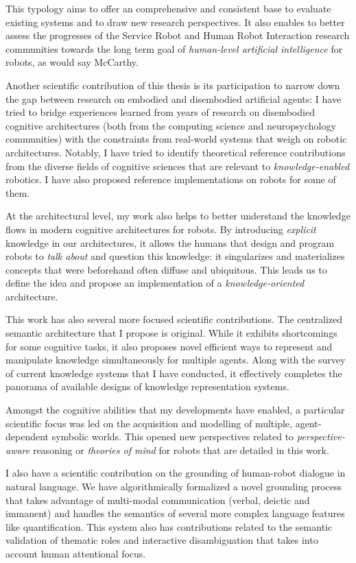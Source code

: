 This typology aims to offer an comprehensive and consistent base to evaluate
existing systems and to draw new research perspectives. It also enables to
better assess the progresses of the Service Robot and Human Robot Interaction
research communities towards the long term goal of \emph{human-level artificial
intelligence} for robots, as would say McCarthy.

Another scientific contribution of this thesis is its participation to
narrow down the gap between research on embodied and disembodied artificial
agents: I have tried to bridge experiences learned from years of research on
disembodied cognitive architectures (both from the computing science and
neuropsychology communities) with the constraints from real-world systems that
weigh on robotic architectures. Notably, I have tried to identify
theoretical reference contributions from the diverse fields of cognitive
sciences that are relevant to \emph{knowledge-enabled} robotics. I have also
proposed reference implementations on robots for some of them.

At the architectural level, my work also helps to better understand the
knowledge flows in modern cognitive architectures for robots. By introducing
\emph{explicit} knowledge in our architectures, it allows the humans that
design and program robots to \emph{talk about} and question this knowledge: it
singularizes and materializes concepts that were beforehand often
diffuse and ubiquitous. This leads us to define the idea and propose an
implementation of a \emph{knowledge-oriented} architecture.

This work has also several more focused scientific contributions. The
centralized semantic architecture that I propose is original. While it
exhibits shortcomings for some cognitive tasks, it also proposes novel efficient
ways to represent and manipulate knowledge simultaneously for multiple agents.
Along with the survey of current knowledge systems that I have conducted,
it effectively completes the panorama of available designs of knowledge
representation systems.

Amongst the cognitive abilities that my developments have enabled, a
particular scientific focus was led on the acquisition and modelling of
multiple, agent-dependent symbolic worlds. This opened new perspectives related
to \emph{perspective-aware} reasoning or \emph{theories of mind} for robots
that are detailed in this work.

I also have a scientific contribution on the grounding of human-robot
dialogue in natural language. We have algorithmically formalized a novel
grounding process that takes advantage of multi-modal communication (verbal,
deictic and immanent) and handles the semantics of several more complex
language features like quantification. This system also has contributions
related to the semantic validation of thematic roles and interactive
disambiguation that takes into account human attentional focus.

